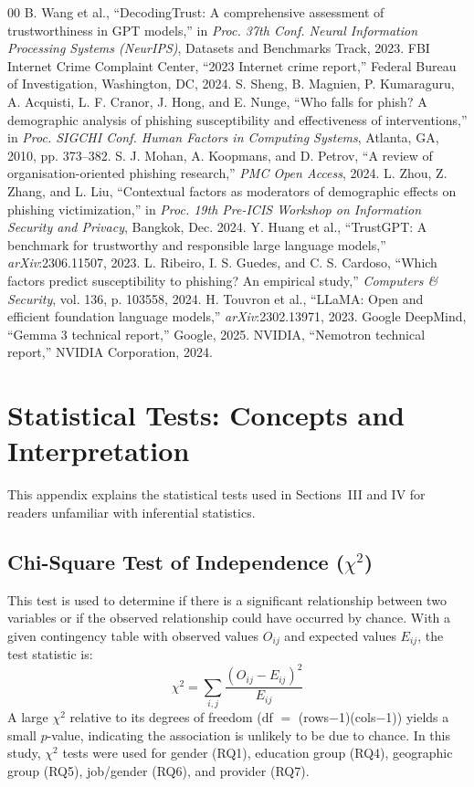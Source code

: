 \documentclass[conference]{IEEEtran}
\begin{document}
\begin{thebibliography}{00}
 B. Wang et al., ``DecodingTrust: A comprehensive assessment of trustworthiness in GPT models,'' in \textit{Proc. 37th Conf. Neural Information Processing Systems (NeurIPS)}, Datasets and Benchmarks Track, 2023.
 FBI Internet Crime Complaint Center, ``2023 Internet crime report,'' Federal Bureau of Investigation, Washington, DC, 2024.
 S. Sheng, B. Magnien, P. Kumaraguru, A. Acquisti, L. F. Cranor, J. Hong, and E. Nunge, ``Who falls for phish? A demographic analysis of phishing susceptibility and effectiveness of interventions,'' in \textit{Proc. SIGCHI Conf. Human Factors in Computing Systems}, Atlanta, GA, 2010, pp. 373--382.
  S. J. Mohan, A. Koopmans, and D. Petrov, ``A review of organisation-oriented phishing research,'' \textit{PMC Open Access}, 2024.
 L. Zhou, Z. Zhang, and L. Liu, ``Contextual factors as moderators of
demographic effects on phishing victimization,'' in \textit{Proc. 19th Pre-ICIS Workshop on Information Security and Privacy}, Bangkok, Dec. 2024. 
 Y. Huang et al., ``TrustGPT: A benchmark for trustworthy and responsible large language models,'' \textit{arXiv}:2306.11507, 2023.
 L. Ribeiro, I. S. Guedes, and C. S. Cardoso, ``Which factors predict susceptibility to phishing? An empirical study,'' \textit{Computers \& Security}, vol. 136, p. 103558, 2024.
 H. Touvron et al., ``LLaMA: Open and efficient foundation language models,'' \textit{arXiv}:2302.13971, 2023.
 Google DeepMind, ``Gemma 3 technical report,'' Google, 2025. 
 NVIDIA, ``Nemotron technical report,'' NVIDIA Corporation, 2024.
\end{thebibliography}

\appendix
 
\section{Statistical Tests: Concepts and Interpretation}
This appendix explains the statistical tests used in Sections~III and IV for
readers unfamiliar with inferential statistics.
 
\subsection{Chi-Square Test of Independence ($\chi^2$)}
This test is used to determine if there is a significant relationship between two variables or if the observed relationship could have occurred by chance. With a given contingency table with observed values $O_{ij}$ and expected values $E_{ij}$, the test statistic is:
\[
\chi^2 = \sum_{i,j} \frac{(O_{ij} - E_{ij})^2}{E_{ij}}
\]
A large $\chi^2$ relative to its degrees of freedom (df $=$ (rows$-$1)(cols$-$1)) yields a small $p$-value, indicating the association is unlikely to be due to chance. 
In this study, $\chi^2$ tests were used for gender (RQ1), education group (RQ4), geographic group (RQ5), job/gender (RQ6), and provider (RQ7).
 
\end{document}
